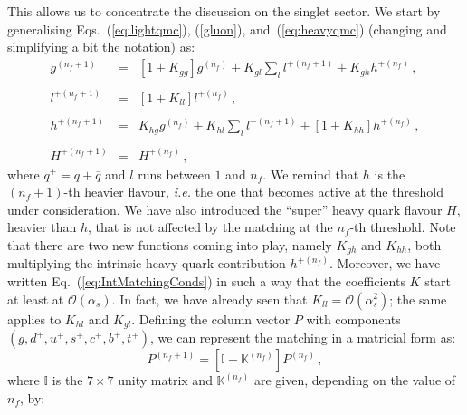 \documentclass[10pt,a4paper]{article}
\begin{document}
This allows us to concentrate the discussion on the singlet sector. We
start by generalising Eqs.~(\ref{eq:lightqmc}), (\ref{gluon}),
and~(\ref{eq:heavyqmc}) (changing and simplifying a bit the notation)
as:
\begin{equation}
\begin{array}{rcl}
  \displaystyle g^{(n_f+1)}&=&\displaystyle
                               [1+K_{gg}]g^{(n_f)}+K_{gl}\sum_l
                               l^{+(n_f+1)} + K_{gh}h^{+(n_f)}\,,\\
  \\
  \displaystyle l^{+(n_f+1)}&=&\displaystyle [1+K_{ll}]l^{+(n_f)}\,,\\
  \\
  \displaystyle h^{+(n_f+1)}&=&\displaystyle K_{hg}g^{(n_f)} + K_{hl}\sum_l
                                l^{+(n_f+1)}+[1+K_{hh}]h^{+(n_f)}\,,\\
  \\
  H^{+(n_f+1)} &=& H^{+(n_f)}\,,
\end{array}
\label{eq:IntMatchingConds}
\end{equation}
where $q^+=q+\overline{q}$ and $l$ runs between $1$ and $n_f$. We
remind that $h$ is the $(n_f+1)$-th heavier flavour, \textit{i.e.}
the one that becomes active at the threshold under consideration. We
have also introduced the ``super'' heavy quark flavour $H$, heavier
than $h$, that is not affected by the matching at the $n_f$-th
threshold. Note that there are two new functions coming into play,
namely $K_{gh}$ and $K_{hh}$, both multiplying the intrinsic
heavy-quark contribution $h^{+(n_f)}$. Moreover, we have written
Eq.~(\ref{eq:IntMatchingConds}) in such a way that the coefficients
$K$ start at least at $\mathcal{O}(\alpha_s)$. In fact, we have
already seen that $K_{ll}=\mathcal{O}(\alpha_s^2)$; the same applies
to $K_{hl}$ and $K_{gl}$. Defining the column vector $P$ with
components $(g,d^+,u^+,s^+,c^+,b^+,t^+)$, we can represent the
matching in a matricial form as:
\begin{equation}
P^{(n_f+1)} = \left[\mathbb{I}+\mathbb{K}^{(n_f)}\right]P^{(n_f)}\,,
\end{equation}
where $\mathbb{I}$ is the $7\times7$ unity matrix and
$\mathbb{K}^{(n_f)}$ are given, depending on the value of $n_f$, by:
\end{document}
